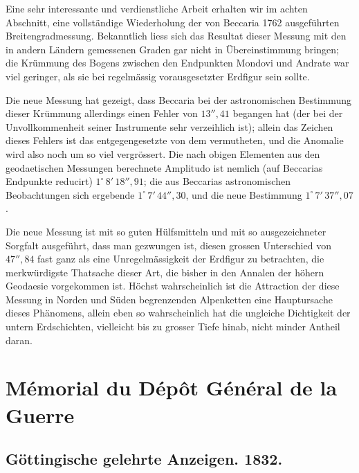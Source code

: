 \documentclass[fontsize=10pt,paper=a5,pagesize,headings=small,headinclude=true,footinclude=true]{scrbook}
\begin{document}
Eine sehr interessante und verdienstliche Arbeit erhalten wir im achten Abschnitt, eine vollständige Wiederholung der von Beccaria 1762 ausgeführten Breitengradmessung. Bekanntlich liess sich das Resultat dieser Messung mit den in andern Ländern gemessenen Graden gar nicht in Übereinstimmung bringen; die Krümmung des Bogens zwischen den Endpunkten Mondovi und Andrate war viel geringer, als sie bei regelmässig vorausgesetzter Erdfigur sein sollte.

Die neue Messung hat gezeigt, dass Beccaria bei der astronomischen Bestimmung dieser Krümmung allerdings einen Fehler von $13''{,}41$ begangen hat (der bei der Unvollkommenheit seiner Instrumente sehr verzeihlich ist); allein das Zeichen dieses Fehlers ist das entgegengesetzte von dem vermutheten, und die Anomalie wird also noch um so viel vergrössert. Die nach obigen Elementen aus den geodaetischen Messungen berechnete Amplitudo ist nemlich (auf Beccarias Endpunkte reducirt) $1^\circ\,8'\,18''{,}91$; die aus Beccarias astronomischen Beobachtungen sich ergebende $1^\circ\,7'\,44''{,}30$, und die neue Bestimmung $1^\circ\,7'\,37''{,}07$.

Die neue Messung ist mit so guten Hülfsmitteln und mit so ausgezeichneter Sorgfalt ausgeführt, dass man gezwungen ist, diesen grossen Unterschied von $47''{,}84$ fast ganz als eine Unregelmässigkeit der Erdfigur zu betrachten, die merkwürdigste Thatsache dieser Art, die bisher in den Annalen der höhern Geodaesie vorgekommen ist. Höchst wahrscheinlich ist die Attraction der diese Messung in Norden und Süden begrenzenden Alpenketten eine Hauptursache dieses Phänomens, allein eben so wahrscheinlich hat die ungleiche Dichtigkeit der untern Erdschichten, vielleicht bis zu grosser Tiefe hinab, nicht minder Antheil daran.

\newpage
\section*{Mémorial du Dépôt Général de la Guerre}

\subsection*{Göttingische gelehrte Anzeigen. 1832.}
\end{document}
